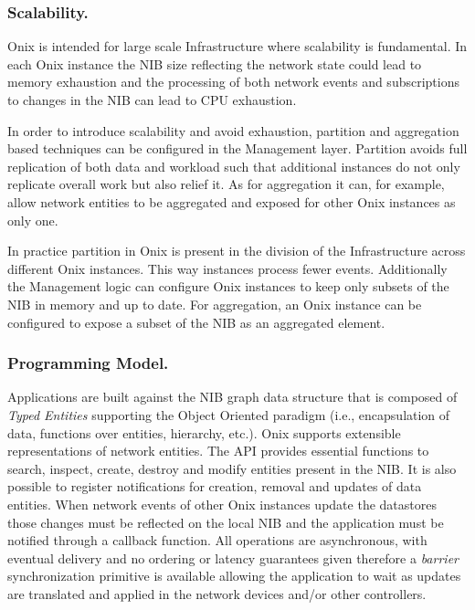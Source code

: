 \begin{itemize}
\subsubsection{Scalability.} Onix is intended for large scale Infrastructure where scalability is
fundamental. In each Onix instance the NIB
size reflecting the network state could lead to memory
exhaustion   and the processing of both network events and
subscriptions 
to changes in  the NIB can lead to CPU exhaustion.

In order to introduce scalability and avoid exhaustion, partition and
aggregation based techniques can be configured in the Management
layer. Partition avoids full replication of both data  and workload
such that additional instances do not only replicate overall work but
also relief it. As for aggregation it can, for example, allow network entities to be
aggregated and exposed for other Onix instances as only one.

In practice partition in Onix is present in the division of the
Infrastructure across different Onix instances. 
This way
instances process fewer events. Additionally the Management logic can
configure Onix instances to keep only subsets of the NIB in memory and
up to date. For aggregation, an Onix instance can be configured to
expose a subset of the NIB as an aggregated element. 

\subsubsection{Programming Model.} Applications are built against the NIB graph data structure that is
composed of \emph{Typed Entities} supporting the Object
Oriented paradigm (i.e., encapsulation of data, functions over
entities, hierarchy, etc.). Onix supports extensible representations of
network entities. The
API provides essential functions to search, inspect, create, destroy and
modify entities present in the NIB. It is also possible to register
notifications for creation, removal and updates of data
entities. When network events of other Onix instances update the
datastores those changes must be reflected on the local NIB and the
application must be notified through a callback function. 
All operations are asynchronous, with
eventual delivery and no ordering or latency guarantees given
therefore a \emph{barrier} synchronization primitive is available
allowing the application to wait as
updates are translated and applied in the network devices and/or other
controllers. 


\end{itemize}

